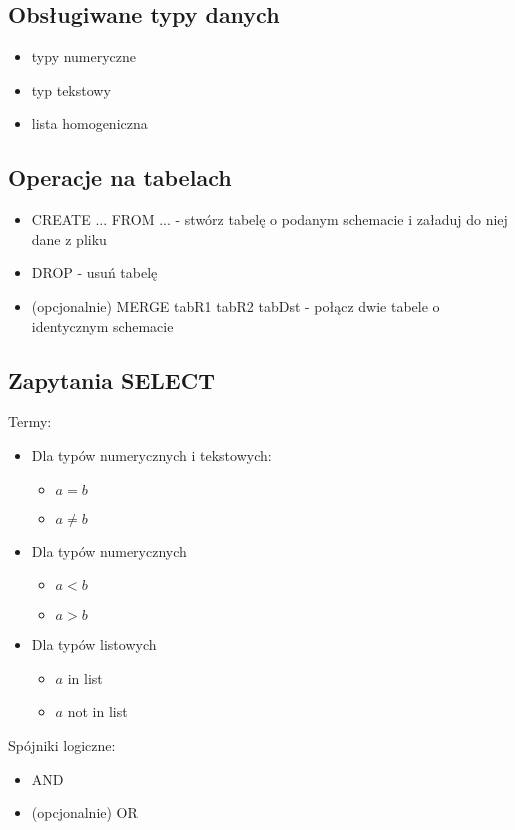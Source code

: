 \documentclass[11pt]{article}
\begin{document}
        \subsection{Obsługiwane typy danych}
            \begin{itemize}
                \item typy numeryczne
                \item typ tekstowy
                \item lista homogeniczna
            \end{itemize}
        \subsection{Operacje na tabelach}
            \begin{itemize}
                \item CREATE ... FROM ... - stwórz tabelę o podanym schemacie i załaduj do niej dane z pliku
                \item DROP - usuń tabelę
                \item (opcjonalnie) MERGE tabR1 tabR2 tabDst - połącz dwie tabele o identycznym schemacie
            \end{itemize}
         \subsection{Zapytania SELECT}
            Termy:
             \begin{itemize}
                \item Dla typów numerycznych i tekstowych:
                    \begin{itemize}
                        \item $a = b$
                        \item $a \neq b$
                    \end{itemize}
                \item Dla typów numerycznych
                    \begin{itemize}
                        \item $a < b$
                        \item $a > b$
                    \end{itemize}
                \item Dla typów listowych
                    \begin{itemize}
                        \item $a$ in list
                        \item $a$ not in list
                    \end{itemize}
            \end{itemize}
            Spójniki logiczne:
            \begin{itemize}
                \item AND
                \item (opcjonalnie) OR
            \end{itemize}
\end{document}

